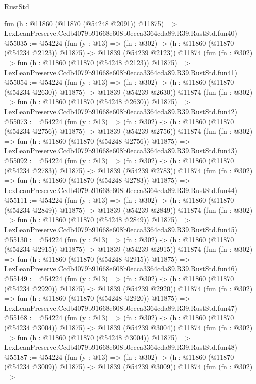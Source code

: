 \begin{lexlean}{RustStd}
\begin{coremodule}
    fun (h : @11860 (@11870 (@54248 @2091)) @11875) =>
    LexLeanPreserve.Ccdb4079b91668e608b0ecca3364cda89.R39.RustStd.fun40)
@55035 := @54224
    (fun (y : @13) =>
    (fn : @302) -> (h : @11860 (@11870 (@54234 @2123)) @11875) -> @11839 (@54239 @2123))
    @11874
    (fun (fn : @302) =>
    fun (h : @11860 (@11870 (@54248 @2123)) @11875) =>
    LexLeanPreserve.Ccdb4079b91668e608b0ecca3364cda89.R39.RustStd.fun41)
@55054 := @54224
    (fun (y : @13) =>
    (fn : @302) -> (h : @11860 (@11870 (@54234 @2630)) @11875) -> @11839 (@54239 @2630))
    @11874
    (fun (fn : @302) =>
    fun (h : @11860 (@11870 (@54248 @2630)) @11875) =>
    LexLeanPreserve.Ccdb4079b91668e608b0ecca3364cda89.R39.RustStd.fun42)
@55073 := @54224
    (fun (y : @13) =>
    (fn : @302) -> (h : @11860 (@11870 (@54234 @2756)) @11875) -> @11839 (@54239 @2756))
    @11874
    (fun (fn : @302) =>
    fun (h : @11860 (@11870 (@54248 @2756)) @11875) =>
    LexLeanPreserve.Ccdb4079b91668e608b0ecca3364cda89.R39.RustStd.fun43)
@55092 := @54224
    (fun (y : @13) =>
    (fn : @302) -> (h : @11860 (@11870 (@54234 @2783)) @11875) -> @11839 (@54239 @2783))
    @11874
    (fun (fn : @302) =>
    fun (h : @11860 (@11870 (@54248 @2783)) @11875) =>
    LexLeanPreserve.Ccdb4079b91668e608b0ecca3364cda89.R39.RustStd.fun44)
@55111 := @54224
    (fun (y : @13) =>
    (fn : @302) -> (h : @11860 (@11870 (@54234 @2849)) @11875) -> @11839 (@54239 @2849))
    @11874
    (fun (fn : @302) =>
    fun (h : @11860 (@11870 (@54248 @2849)) @11875) =>
    LexLeanPreserve.Ccdb4079b91668e608b0ecca3364cda89.R39.RustStd.fun45)
@55130 := @54224
    (fun (y : @13) =>
    (fn : @302) -> (h : @11860 (@11870 (@54234 @2915)) @11875) -> @11839 (@54239 @2915))
    @11874
    (fun (fn : @302) =>
    fun (h : @11860 (@11870 (@54248 @2915)) @11875) =>
    LexLeanPreserve.Ccdb4079b91668e608b0ecca3364cda89.R39.RustStd.fun46)
@55149 := @54224
    (fun (y : @13) =>
    (fn : @302) -> (h : @11860 (@11870 (@54234 @2920)) @11875) -> @11839 (@54239 @2920))
    @11874
    (fun (fn : @302) =>
    fun (h : @11860 (@11870 (@54248 @2920)) @11875) =>
    LexLeanPreserve.Ccdb4079b91668e608b0ecca3364cda89.R39.RustStd.fun47)
@55168 := @54224
    (fun (y : @13) =>
    (fn : @302) -> (h : @11860 (@11870 (@54234 @3004)) @11875) -> @11839 (@54239 @3004))
    @11874
    (fun (fn : @302) =>
    fun (h : @11860 (@11870 (@54248 @3004)) @11875) =>
    LexLeanPreserve.Ccdb4079b91668e608b0ecca3364cda89.R39.RustStd.fun48)
@55187 := @54224
    (fun (y : @13) =>
    (fn : @302) -> (h : @11860 (@11870 (@54234 @3009)) @11875) -> @11839 (@54239 @3009))
    @11874
    (fun (fn : @302) =>

\end{coremodule}
\end{lexlean}
